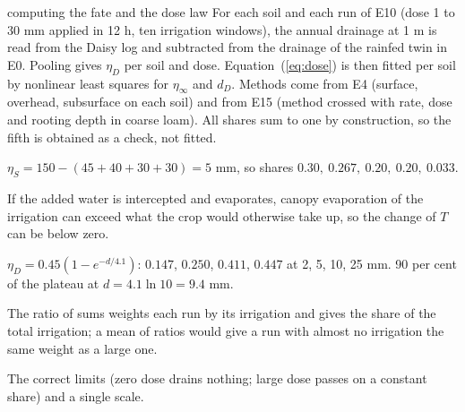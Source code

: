 
\begin{daisybox}{computing the fate and the dose law}
For each soil and each run of E10 (dose 1 to 30 mm applied in 12 h, ten irrigation windows), the annual drainage at 1 m is read from the Daisy log and subtracted from the drainage of the rainfed twin in E0. Pooling gives $\eta_D$ per soil and dose. Equation~(\ref{eq:dose}) is then fitted per soil by nonlinear least squares for $\eta_\infty$ and $d_D$. Methods come from E4 (surface, overhead, subsurface on each soil) and from E15 (method crossed with rate, dose and rooting depth in coarse loam). All shares sum to one by construction, so the fifth is obtained as a check, not fitted.
\end{daisybox}

\sol  $\eta_S=150-(45+40+30+30)=5$ mm, so shares $0.30,\ 0.267,\ 0.20,\ 0.20,\ 0.033$.

\sol  If the added water is intercepted and evaporates, canopy evaporation of the irrigation can exceed what the crop would otherwise take up, so the change of $T$ can be below zero.

\sol  $\eta_D=0.45(1-e^{-d/4.1})$: $0.147$, $0.250$, $0.411$, $0.447$ at 2, 5, 10, 25 mm. 90 per cent of the plateau at $d=4.1\ln10=9.4$ mm.

\sol  The ratio of sums weights each run by its irrigation and gives the share of the total irrigation; a mean of ratios would give a run with almost no irrigation the same weight as a large one.

\sol  The correct limits (zero dose drains nothing; large dose passes on a constant share) and a single scale.



